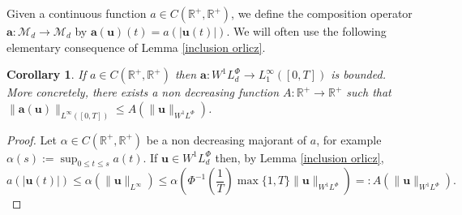 \documentclass[twoside]{article}
\newtheorem{cor}[thm]{Corollary}
\newtheorem{lem}[thm]{Lemma}
\theoremstyle{remark}
\newcommand{\lphi}{L^{\Phi}}
\newcommand{\ephi}{E^{\Phi}}
\newcommand{\wphi}{W^{1}\lphi}
\renewcommand{\b}[1]{\boldsymbol{#1}}
\renewcommand{\leq}{\leqslant}
\begin{document}
 Given a continuous function $a\in C(\mathbb{R}^+,\mathbb{R}^+)$, we define the composition operator $\b{a}:\mathcal{M}_d\to \mathcal{M}_d$ by $\b{a}(\b{u})(t)= a(|\b{u}(t)|)$.
We will often use the following elementary consequence of Lemma \ref{inclusion orlicz}. 
\begin{cor}\label{a_bound} If $a\in C(\mathbb{R}^+,\mathbb{R}^+)$ then $\b{a}:\wphi_d\to L^{\infty}_1([0,T])$ is bounded. 
More concretely,  there exists a non decreasing function $A:\mathbb{R}^+\to\mathbb{R}^+$ such that
 $\|\b{a}(\b{u})\|_{L^{\infty}([0,T])}\leq A(\|\b{u}\|_{\wphi})$.
\end{cor}

\begin{proof}  Let $\alpha\in C(\mathbb{R}^+,\mathbb{R}^+)$ be a  non decreasing  majorant of $a$, for example 
$\alpha(s):=\sup_{0\leq t\leq s}a(t)$.  If $\b{u}\in \wphi_d$ then, by Lemma \ref{inclusion orlicz}, 
\[a(|\b{u}(t)|)\leq \alpha(\|\b{u}\|_{L^{\infty}})\leq 
\alpha\left(\Phi^{-1}\left(\frac{1}{T}\right)\max\{1,T\} \|\b{u}\|_{\wphi}\right)=: 
A(\|\b{u}\|_{\wphi}).\]
\end{proof}


%

\end{document}
